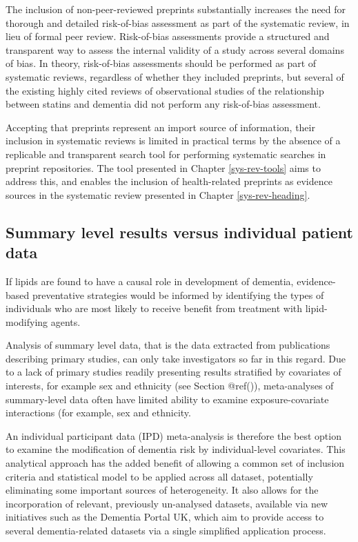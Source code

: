 \documentclass[a4paper, twoside]{templates/ociamthesis}
\begin{document}
The inclusion of non-peer-reviewed preprints substantially increases the need for thorough and detailed risk-of-bias assessment as part of the systematic review, in lieu of formal peer review. Risk-of-bias assessments provide a structured and transparent way to assess the internal validity of a study across several domains of bias. In theory, risk-of-bias assessments should be performed as part of systematic reviews, regardless of whether they included preprints, but several of the existing highly cited reviews of observational studies of the relationship between statins and dementia did not perform any risk-of-bias assessment.

Accepting that preprints represent an import source of information, their inclusion in systematic reviews is limited in practical terms by the absence of a replicable and transparent search tool for performing systematic searches in preprint repositories. The tool presented in Chapter \ref{sys-rev-tools} aims to address this, and enables the inclusion of health-related preprints as evidence sources in the systematic review presented in Chapter \ref{sys-rev-heading}.

\hypertarget{summary-level-results-versus-individual-patient-data}{%
\subsection{Summary level results versus individual patient data}\label{summary-level-results-versus-individual-patient-data}}

If lipids are found to have a causal role in development of dementia, evidence-based preventative strategies would be informed by identifying the types of individuals who are most likely to receive benefit from treatment with lipid-modifying agents.

Analysis of summary level data, that is the data extracted from publications describing primary studies, can only take investigators so far in this regard. Due to a lack of primary studies readily presenting results stratified by covariates of interests, for example sex and ethnicity (see Section @ref()), meta-analyses of summary-level data often have limited ability to examine exposure-covariate interactions (for example, sex and ethnicity.

An individual participant data (IPD) meta-analysis is therefore the best option to examine the modification of dementia risk by individual-level covariates. This analytical approach has the added benefit of allowing a common set of inclusion criteria and statistical model to be applied across all dataset, potentially eliminating some important sources of heterogeneity. It also allows for the incorporation of relevant, previously un-analysed datasets, available via new initiatives such as the Dementia Portal UK, which aim to provide access to several dementia-related datasets via a single simplified application process.
\end{document}
